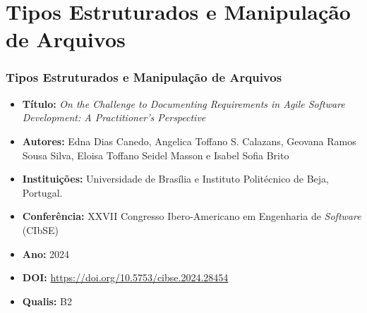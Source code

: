 \section{Tipos Estruturados e Manipulação de Arquivos}
\begin{frame}
	\frametitle{Tipos Estruturados e Manipulação de Arquivos}
	\begin{itemize}
		\item \textbf{Título:}	\textit{On the Challenge to Documenting Requirements in Agile Software Development: A Practitioner’s Perspective}
		
		
		\item \textbf{Autores:}	Edna Dias Canedo, Angelica Toffano S. Calazans, Geovana Ramos Sousa Silva, Eloisa Toffano Seidel Masson e Isabel Sofia Brito 
		
		\item \textbf{Instituições:} Universidade de Brasília e Instituto Politécnico de Beja, Portugal.
		
		\item \textbf{Conferência:}	XXVII Congresso Ibero-Americano em Engenharia de \textit{Software} (CIbSE) 
		
		\item \textbf{Ano:}	2024 
		
		\item \textbf{DOI:}	\url{https://doi.org/10.5753/cibse.2024.28454}
		
		\item \textbf{Qualis:} B2
	\end{itemize}
\end{frame}



